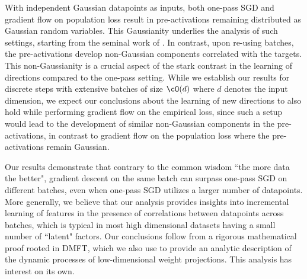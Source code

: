 With independent Gaussian datapoints as inputs, both one-pass SGD and gradient flow on population loss result in pre-activations remaining distributed as Gaussian random variables. This Gaussianity underlies the analysis of such settings,  starting from the seminal work of \cite{saad1995line}.
In contrast, upon re-using batches, the pre-activations develop non-Gaussian components correlated with the targets.  This non-Gaussianity is a crucial aspect of the stark contrast in the learning of directions compared to the one-pass setting. While we establish our results for discrete steps with extensive batches of size $\cO(d)$ where $d$ denotes the input dimension, we expect our conclusions about the learning of new directions to also hold while performing gradient flow on the empirical loss, since such a setup would lead to the development of similar non-Gaussian components in the pre-activations, in contrast to gradient flow on the population loss where the pre-activations remain Gaussian.

Our results demonstrate that contrary to the common wisdom ``the more data the better", gradient descent on the same batch can surpass one-pass SGD on different batches, even when one-pass SGD utilizes a larger number of datapoints. More generally, we believe that our analysis provides insights into incremental learning of features in the presence of correlations between datapoints across batches, which is typical in most high dimensional datasets having a small number of ``latent" factors. Our conclusions follow from a rigorous mathematical proof rooted in DMFT, which we also use to provide an analytic description of the dynamic processes of low-dimensional weight projections. This analysis has interest on its own.
